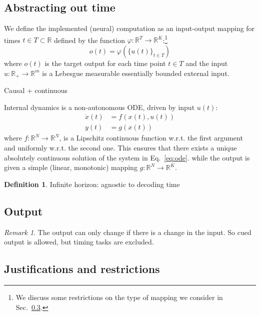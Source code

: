 \documentclass{scrartcl}
\theoremstyle{definition}
\newtheorem{definition}{Definition}
\theoremstyle{remark}
\newtheorem{remark}{Remark}
\newcommand{\reals}{\mathbb{R}}
\begin{document}
\subsection{Abstracting out time}

We define the implemented (neural) computation as an input-output mapping for times $t\in T\subset\reals$ defined by the function $\varphi:\reals^T\rightarrow\reals^K$:\footnote{We discuss some restrictions on the type of mapping we consider in Sec.~\ref{sec:jar}.}
\begin{equation}
o(t) = \varphi(\{u(t)\}_{t\in T})
\end{equation}
where $o(t)$ is the target output for each time point $t\in T$ and the input  $u:\reals_{+}\to \reals^{m}$  is a Lebesgue measurable essentially bounded external input.

Causal + continuous \citep{lanthaler2023}

Internal dynamics is a non-autonomous ODE, driven by input $u(t)$:
\begin{align}
\dot x(t) &= f(x(t),u(t))\label{eq:ode}\\
y(t) &= g(x(t))	\label{eq:output}
\end{align}
where $f:\reals^N\rightarrow\reals^N$, is a Lipschitz continuous function w.r.t. the first argument and uniformly w.r.t. the second one. This ensures that there exists a unique absolutely continuous solution of the system in Eq.~\ref{eq:ode}.
while the output is given a simple (linear, monotonic) mapping $g:\reals^N\rightarrow\reals^K$.




\begin{definition}
Infinite horizon: agnostic to decoding time
\end{definition}






\subsection{Output}
\begin{remark}
The output can only change if there is a change in the input. 
So cued output is allowed, but timing tasks are excluded.
\end{remark}

\subsection{Justifications and restrictions}\label{sec:jar}
\end{document}
